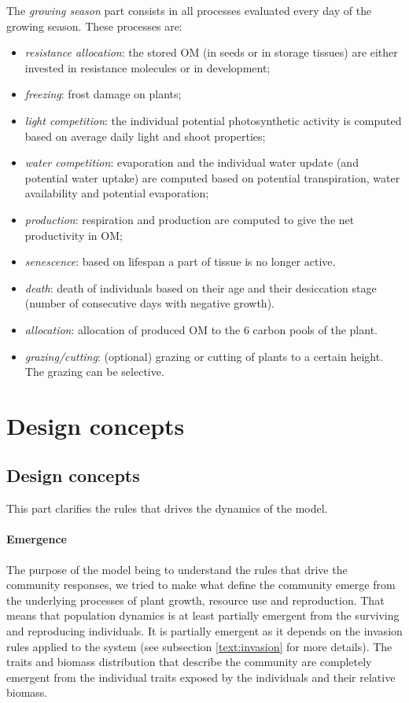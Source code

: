 \documentclass[a4paper,twoside, justified,marginals=raggedright]{tufte-handout}
\begin{document}
The \textit{growing season} part consists in all processes evaluated every day of the growing season. These processes are:
\begin{itemize}
\setlength\itemsep{0em}
\item \textit{resistance allocation}: the stored OM (in seeds or in storage tissues) are either invested in resistance molecules or in development;
\item \textit{freezing}: frost damage on plants;
\item \textit{light competition}: the individual potential photosynthetic activity is computed based on average daily light and shoot properties;
\item \textit{water competition}: evaporation and the individual water update (and potential water uptake) are computed based on potential transpiration, water availability and potential evaporation;
\item \textit{production}: respiration and production are computed to give the net productivity in OM;
\item \textit{senescence}: based on lifespan a part of tissue is no longer active.
\item \textit{death}: death of individuals based on their age and their desiccation stage (number of consecutive days with negative growth).
\item \textit{allocation}: allocation of produced OM to the 6 carbon pools of the plant.
\item \textit{grazing/cutting}: (optional) grazing or cutting of plants to a certain height. The grazing can be selective.
\end{itemize}

\section{Design concepts}

\subsection{Design concepts}
This part clarifies the rules that drives the dynamics of the model.

\paragraph{Emergence} The purpose of the model being to understand the rules that drive the community responses, we tried to make what define the community emerge from the underlying processes of plant growth, resource use and reproduction. That means that population dynamics is at least partially emergent from the surviving and reproducing individuals. It is partially emergent as it depends on the invasion rules applied to the system (see subsection \ref{text:invasion} for more details). The traits and biomass distribution that describe the community are completely emergent from the individual traits exposed by the individuals and their relative biomass.
\end{document}
